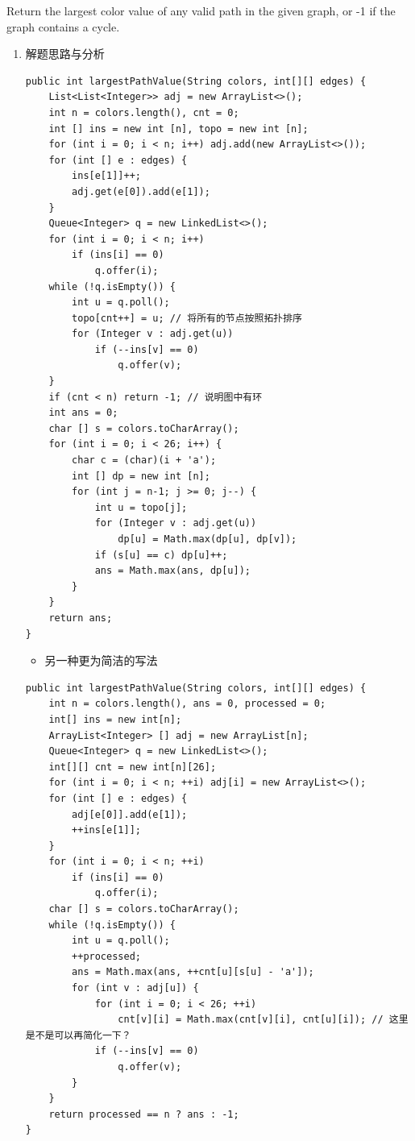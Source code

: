 \documentclass[9pt, b5paaper]{book}
\begin{document}
Return the largest color value of any valid path in the given graph,
or -1 if the graph contains a cycle.
\begin{enumerate}
\item 解题思路与分析
\label{sec-1-1-1-1}
\begin{verbatim}
public int largestPathValue(String colors, int[][] edges) {
    List<List<Integer>> adj = new ArrayList<>();
    int n = colors.length(), cnt = 0; 
    int [] ins = new int [n], topo = new int [n]; 
    for (int i = 0; i < n; i++) adj.add(new ArrayList<>());
    for (int [] e : edges) {
        ins[e[1]]++;
        adj.get(e[0]).add(e[1]);
    }
    Queue<Integer> q = new LinkedList<>();
    for (int i = 0; i < n; i++)
        if (ins[i] == 0)
            q.offer(i);
    while (!q.isEmpty()) {
        int u = q.poll();
        topo[cnt++] = u; // 将所有的节点按照拓扑排序
        for (Integer v : adj.get(u)) 
            if (--ins[v] == 0)
                q.offer(v);
    }
    if (cnt < n) return -1; // 说明图中有环
    int ans = 0;
    char [] s = colors.toCharArray();
    for (int i = 0; i < 26; i++) {
        char c = (char)(i + 'a');
        int [] dp = new int [n];
        for (int j = n-1; j >= 0; j--) {
            int u = topo[j];
            for (Integer v : adj.get(u)) 
                dp[u] = Math.max(dp[u], dp[v]);
            if (s[u] == c) dp[u]++;
            ans = Math.max(ans, dp[u]);
        }
    }
    return ans;
}
\end{verbatim}
\begin{itemize}
\item 另一种更为简洁的写法
\end{itemize}
\begin{verbatim}
public int largestPathValue(String colors, int[][] edges) {
    int n = colors.length(), ans = 0, processed = 0;
    int[] ins = new int[n];
    ArrayList<Integer> [] adj = new ArrayList[n];
    Queue<Integer> q = new LinkedList<>();
    int[][] cnt = new int[n][26];
    for (int i = 0; i < n; ++i) adj[i] = new ArrayList<>();
    for (int [] e : edges) {
        adj[e[0]].add(e[1]);
        ++ins[e[1]];
    }
    for (int i = 0; i < n; ++i)
        if (ins[i] == 0)
            q.offer(i);
    char [] s = colors.toCharArray();
    while (!q.isEmpty()) {
        int u = q.poll();
        ++processed;
        ans = Math.max(ans, ++cnt[u][s[u] - 'a']);
        for (int v : adj[u]) {
            for (int i = 0; i < 26; ++i)
                cnt[v][i] = Math.max(cnt[v][i], cnt[u][i]); // 这里是不是可以再简化一下？
            if (--ins[v] == 0)
                q.offer(v);
        }
    }
    return processed == n ? ans : -1;
}
\end{verbatim}
\end{enumerate}
\end{document}
